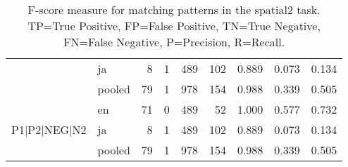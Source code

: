 \begin{table}[h!]
\begin{tabular}{llrrrrrrr}
 & ja & 8 & 1 & 489 & 102 & 0.889 & 0.073 & 0.134 \\
 & pooled & 79 & 1 & 978 & 154 & 0.988 & 0.339 & 0.505 \\
\cline{1-9}
\multirow[t]{3}{*}{P1|P2|NEG|N2} & en & 71 & 0 & 489 & 52 & 1.000 & 0.577 & 0.732 \\
 & ja & 8 & 1 & 489 & 102 & 0.889 & 0.073 & 0.134 \\
 & pooled & 79 & 1 & 978 & 154 & 0.988 & 0.339 & 0.505 \\
\cline{1-9}
\bottomrule
\end{tabular}
\caption{F-score measure for matching patterns in the spatial2 task. TP=True Positive, FP=False Positive, TN=True Negative, FN=False Negative, P=Precision, R=Recall.}
\label{tab:spatial2_f1}
\end{table}
